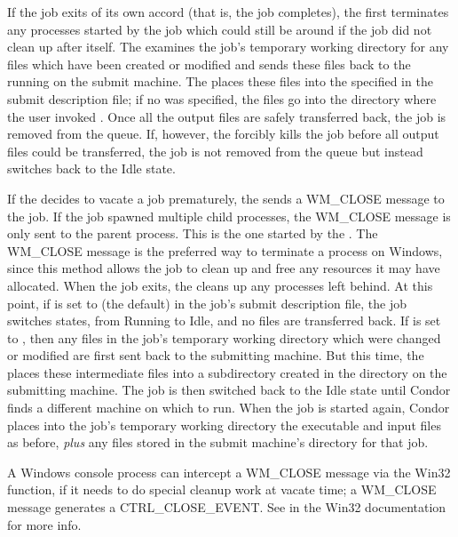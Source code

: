 If the job exits of its own accord (that is, the job completes),
the 
first terminates any processes started by the job which could still be
around if the job did not clean up after itself.
The  examines the job's temporary working directory for any
files which have been created or modified and sends these files back
to the  running on the submit machine.
The 
places these files into the  specified in the
submit description file; 
if no  was specified,
the files go into the directory where the user invoked .
Once all the output files are safely transferred back,
the job is removed from the queue.
If, however, the  forcibly kills the job before all output files
could be transferred, the job is not removed from the queue but instead
switches back to the Idle state.  

If the  decides to vacate a job prematurely,
the  sends a WM\_CLOSE message to the job.
If the job spawned multiple child processes, the WM\_CLOSE message is only
sent to the parent process.
This is the one started by the .
The WM\_CLOSE message is the preferred way to terminate a process on Windows,
since this method allows the job to clean up and free any resources it may
have allocated.
When the job exits, the  cleans up any processes left behind.
At this point, if  is set to
 (the default) in the job's submit description file,
the job switches states, from Running to Idle,
and no files are transferred back.
If  is set to ,
then any files
in the job's temporary working directory which were changed or modified are
first sent back to the submitting machine.
But this time, the  places these
intermediate files into a subdirectory created in the
 directory on the submitting machine.
The job is then switched back to the Idle state until Condor finds
a different machine on which to run.
When the job is started again,
Condor places into the job's temporary working directory the executable
and input files as before,
\emph{plus} any files stored in the submit machine's  directory for that job.  

\Note A Windows console process can intercept a WM\_CLOSE message
via the Win32  function,
if it needs to do special cleanup work at vacate time; 
a WM\_CLOSE message generates a CTRL\_CLOSE\_EVENT.
See  in the Win32
documentation for more info.

